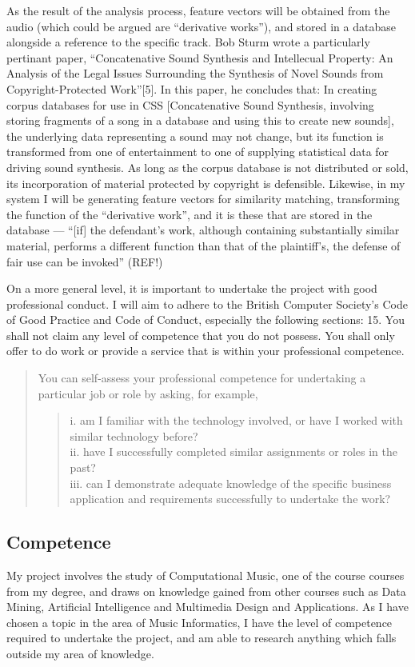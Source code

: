 As the result of the analysis process, feature vectors will be obtained from the
audio (which could be argued are ``derivative works''), and stored in a database
alongside a reference to the specific track. Bob Sturm wrote a particularly
pertinant paper, ``Concatenative Sound Synthesis and Intellecual Property: An
Analysis of the Legal Issues Surrounding the Synthesis of Novel Sounds from
Copyright-Protected Work''[5]. In this paper, he concludes that:
In creating corpus databases for use in CSS [Concatenative Sound
Synthesis, involving storing fragments of a song in a database and
using this to create new sounds], the underlying data representing a
sound may not change, but its function is transformed from one of
entertainment to one of supplying statistical data for driving sound
synthesis. As long as the corpus database is not distributed or sold,
its incorporation of material protected by copyright is defensible.
Likewise, in my system I will be generating feature vectors for similarity matching, transforming the function of the ``derivative work'', and it is these that
are stored in the database — ``[if] the defendant's work, although containing
substantially similar material, performs a different function than that of the
plaintiff's, the defense of fair use can be invoked'' (REF!)

On a more general level, it is important to undertake the project with good
professional conduct. I will aim to adhere to the British Computer Society's
Code of Good Practice and Code of Conduct, especially the following sections:
15. You shall not claim any level of competence that you do not
possess. You shall only offer to do work or provide a service that is
within your professional competence.
\begin{quotation}\noindent
You can self-assess your professional competence for undertaking a particular job or role by asking, for example,
\begin{quotation}\noindent
i. am I familiar with the technology involved, or have I worked with
similar technology before?\\
ii. have I successfully completed similar assignments or roles in the
past?\\
iii. can I demonstrate adequate knowledge of the specific business
application and requirements successfully to undertake the work?
\end{quotation}
\end{quotation}
\subsection{Competence}
My project involves the study of Computational Music, one of the course courses
from my degree, and draws on knowledge gained from other courses such as
Data Mining, Artificial Intelligence and Multimedia Design and Applications.
As I have chosen a topic in the area of Music Informatics, I have the level of
competence required to undertake the project, and am able to research anything
which falls outside my area of knowledge.

